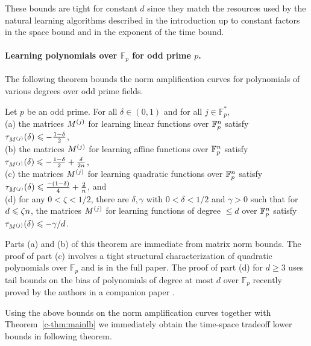 These bounds are tight for constant $d$ since they match the resources used by the natural learning
algorithms described in the introduction up to constant
factors in the space bound and in the exponent of the time bound.


\paragraph{Learning polynomials over $\mathbb{F}_p$ for odd prime $p$.}


The following theorem bounds the norm amplification curves for
polynomials of various degrees over odd prime fields.

\begin{theorem}
\label{thm:linear-complex}
Let $p$ be an odd prime. 
For all $\delta\in (0,1)$ and for all
$j\in \mathbb{F}_p^*$,\\
(a) the matrices $M^{(j)}$ for learning
linear functions over $\mathbb{F}_p^n$ satisfy $\tau_{M^{(j)}}(\delta)\leqslant -\frac{1-\delta}2$,\\
(b) the matrices $M^{(j)}$ for
learning affine functions over $\mathbb{F}_p^n$ satisfy
$\tau_{M^{(j)}}(\delta)\leqslant -\frac{1-\delta}2 +\frac{\delta}{2n}$,\\
(c) the matrices $M^{(j)}$ for learning quadratic functions over
$\mathbb{F}_p^n$ satisfy $\tau_{M^{(j)}}(\delta)\leqslant \frac{-(1-\delta)}4+\frac 2 {n}$, and\\
(d) for any $0<\zeta<1/2$, there are $\delta,\gamma$ with $0<\delta<1/2$ and $\gamma>0$
such that for $d\leqslant \zeta n$, the matrices $M^{(j)}$ for learning functions of degree
$\le d$ over $\mathbb{F}_p^n$ satisfy
$\tau_{M^{(j)}}(\delta)\leqslant -\gamma/d$. 
\end{theorem}

Parts (a) and (b) of this theorem are
immediate from matrix norm bounds.   
The proof of part (c) involves a tight structural
characterization of quadratic polynomials over $\mathbb{F}_p$
and is in the full paper.  
The proof of part (d) for 
$d\ge 3$ uses tail bounds on the bias of polynomials of degree at most
$d$ over $\mathbb{F}_p$ recently proved by the authors in a companion paper \citep{bogy:reedmuller-bias}.

Using the above bounds on the norm amplification curves
together with Theorem~\ref{c-thm:mainlb} we immediately obtain the time-space tradeoff lower bounds in following theorem.

